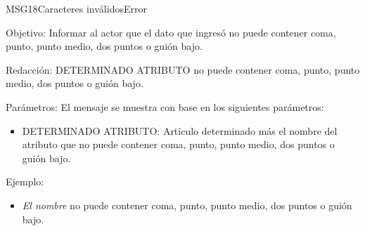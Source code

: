 \begin{mensaje}{MSG18}{Caracteres inválidos}{Error}
	\item [Objetivo:] Informar al actor que el dato que ingresó no puede contener coma, punto, punto medio, dos puntos o guión bajo.
	\item[Redacción:] DETERMINADO ATRIBUTO no puede contener coma, punto, punto medio, dos puntos o guión bajo.
	\item[Parámetros:] El mensaje se muestra con base en los siguientes parámetros:
	\begin{itemize}
		\item DETERMINADO ATRIBUTO: Artículo determinado más el nombre del atributo que no puede contener coma, punto, punto medio, dos puntos o guión bajo.
	\end{itemize}
	\item[Ejemplo:] \begin{itemize}
		\item {\em El nombre} no puede contener coma, punto, punto medio, dos puntos o guión bajo.
	\end{itemize}
\end{mensaje}